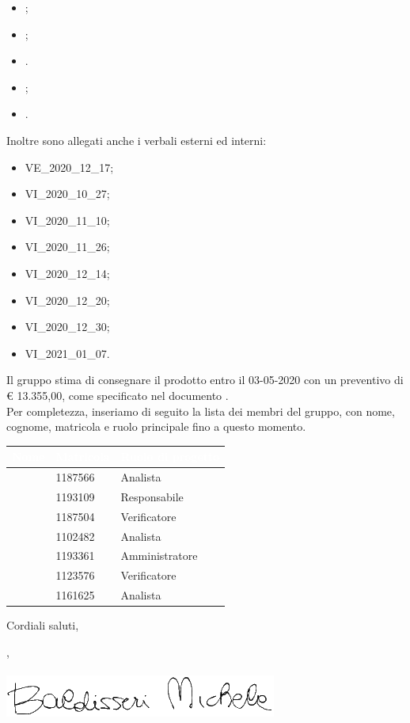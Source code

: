 \documentclass[11pt]{letter}
\begin{document}
\begin{letter}
\begin{itemize}
            \item {};
            \item {};
            \item {}.
            \item {};
            \item {}.
        \end{itemize}
        Inoltre sono allegati anche i verbali esterni ed interni:
        \begin{itemize}
            \item VE\_2020\_12\_17;
            \item VI\_2020\_10\_27;
            \item VI\_2020\_11\_10;
            \item VI\_2020\_11\_26;
            \item VI\_2020\_12\_14;
            \item VI\_2020\_12\_20;
            \item VI\_2020\_12\_30;
            \item VI\_2021\_01\_07.
        \end{itemize}
        Il gruppo stima di consegnare il prodotto entro il 03-05-2020 con un preventivo di \euro{} 13.355,00, come specificato nel documento .\\
        Per completezza, inseriamo di seguito la lista dei membri del gruppo, con nome, cognome, matricola e ruolo principale fino a questo momento.
        {
            \renewcommand{\arraystretch}{2}
            \begin{longtable}{ C{4cm} C{4cm} C{4cm}}
                \textcolor{white}{\textbf{Nome}} & \textcolor{white}{\textbf{Matricola}} & \textcolor{white}{\textbf{Ruolo di progetto}}\\
                \endhead 
                \SG{} & 1187566 & Analista \\
                \BM{} & 1193109 & Responsabile \\
                \RA{} & 1187504 & Verificatore \\
                \SH{} & 1102482 & Analista \\
                \PA{} & 1193361 & Amministratore \\
                \ZM{} & 1123576 & Verificatore \\
                \SP{} & 1161625 & Analista \\
            \end{longtable}
        }
        Cordiali saluti,
        \begin{flushright}
        	\closing{\BM{}, \\ \textit{\Responsabile{}} \\\includegraphics[width=.6\linewidth]{Utility/Images/firmaBM.png}} 
        \end{flushright}
    \end{letter}
\end{document}
